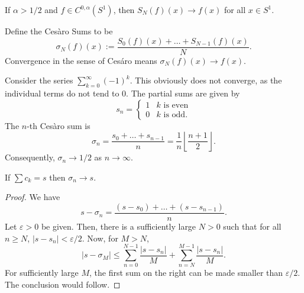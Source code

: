 \begin{remark}
    If $\alpha > 1/2$ and $f\in C^{0,\alpha}(S^1)$, then $S_N(f)(x)\to f(x)$ for all $x\in S^1$.
\end{remark}


\begin{definition}
    Define the Ces\`aro Sums to be 
    \begin{equation*}
        \sigma_N(f)(x) := \frac{S_0(f)(x) + \dots + S_{N - 1}(f)(x)}{N}.
    \end{equation*}
    Convergence in the sense of Ces\'aro means $\sigma_N(f)(x)\to f(x)$.
\end{definition}

\begin{example}
    Consider the series $\sum_{k = 0}^\infty(-1)^k$. This obviously does not converge, as the individual terms do not tend to $0$. The partial sums are given by 
    \begin{equation*}
        s_n = 
        \begin{cases}
            1 & k \text{ is even}\\
            0 & k \text{ is odd}.
        \end{cases}
    \end{equation*}
    The $n$-th Ces\`aro sum is 
    \begin{equation*}
        \sigma_n = \frac{s_0 + \dots + s_{n - 1}}{n} = \frac{1}{n}\left\lfloor\frac{n + 1}{2}\right\rfloor.
    \end{equation*}
    Consequently, $\sigma_n\to 1/2$ as $n\to\infty$.
\end{example}

\begin{proposition}
    If $\sum c_k = s$ then $\sigma_n\to s$.
\end{proposition}
\begin{proof}
    We have 
    \begin{equation*}
        s - \sigma_n = \frac{(s - s_0) + \dots + (s - s_{n - 1})}{n}.
    \end{equation*}
    Let $\varepsilon > 0$ be given. Then, there is a sufficiently large $N > 0$ such that for all $n\ge N$, $|s - s_n| < \varepsilon/2$. Now, for $M > N$,
    \begin{equation*}
        |s - \sigma_M|\le\sum_{n = 0}^{N - 1}\frac{|s - s_n|}{M} + \sum_{n = N}^{M - 1}\frac{|s - s_n|}{M}.
    \end{equation*}
    For sufficiently large $M$, the first sum on the right can be made smaller than $\varepsilon/2$. The conclusion would follow.
\end{proof}

